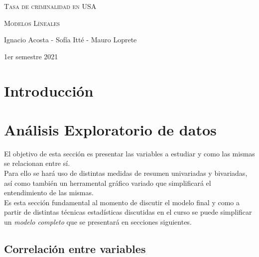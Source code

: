 \documentclass[11pt,a4paper]{article}\usepackage[]{graphicx}\usepackage[]{color}
\begin{document}
\begin{titlepage}
  \centering
  \vspace{5cm}
  {\scshape\Huge Tasa de criminalidad en USA \par}
  \vspace{3cm}
  \vfill
  {\scshape\Large Modelos Líneales \par}
  \vspace{3cm}
  {\Large Ignacio Acosta - Sofía Itté - Mauro Loprete \par}
  {\Large 1er semestre 2021 \par}
\end{titlepage}
\tableofcontents
{}
\listoffigures
\newpage



\section{Introducción}

\newpage
\section{Análisis Exploratorio de datos}

El objetivo de esta sección es presentar las variables a estudiar y como las mismas se relacionan entre sí.
\\

Para ello se hará uso de distintas medidas de resumen univariadas y bivariadas, así como también un herramental gráfico variado que simplificará el entendimiento de las mismas.
\\

Es esta sección fundamental al momento de discutir el modelo final y como a partir de distintas técnicas estadísticas discutidas en el curso se puede simplificar un \textit{modelo completo} que se presentará en secciones siguientes.

\subsection{Correlación entre variables}
\end{document}
